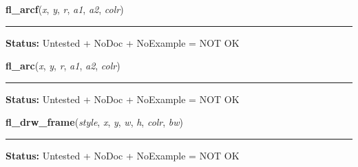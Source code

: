     \label{xformslib:library:fl_arcf}

    \vspace{0.5ex}

\hspace{.8\funcindent}\begin{boxedminipage}{\funcwidth}

    \raggedright \textbf{fl\_arcf}(\textit{x}, \textit{y}, \textit{r}, \textit{a1}, \textit{a2}, \textit{colr})

    \vspace{-1.5ex}

    \rule{\textwidth}{0.5\fboxrule}
\setlength{\parskip}{2ex}
\setlength{\parskip}{1ex}
\textbf{Status:} Untested + NoDoc + NoExample = NOT OK



    \end{boxedminipage}

    \label{xformslib:library:fl_arc}

    \vspace{0.5ex}

\hspace{.8\funcindent}\begin{boxedminipage}{\funcwidth}

    \raggedright \textbf{fl\_arc}(\textit{x}, \textit{y}, \textit{r}, \textit{a1}, \textit{a2}, \textit{colr})

    \vspace{-1.5ex}

    \rule{\textwidth}{0.5\fboxrule}
\setlength{\parskip}{2ex}
\setlength{\parskip}{1ex}
\textbf{Status:} Untested + NoDoc + NoExample = NOT OK



    \end{boxedminipage}

    \label{xformslib:library:fl_drw_frame}

    \vspace{0.5ex}

\hspace{.8\funcindent}\begin{boxedminipage}{\funcwidth}

    \raggedright \textbf{fl\_drw\_frame}(\textit{style}, \textit{x}, \textit{y}, \textit{w}, \textit{h}, \textit{colr}, \textit{bw})

    \vspace{-1.5ex}

    \rule{\textwidth}{0.5\fboxrule}
\setlength{\parskip}{2ex}
\setlength{\parskip}{1ex}
\textbf{Status:} Untested + NoDoc + NoExample = NOT OK



    \end{boxedminipage}


